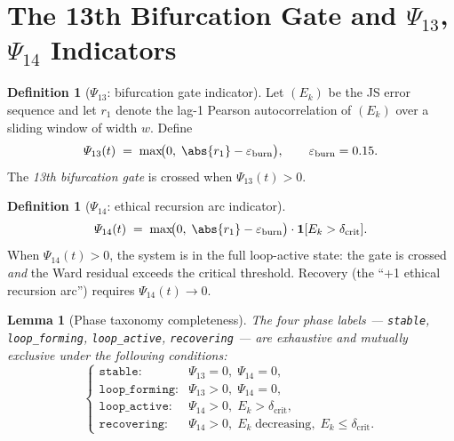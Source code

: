 \documentclass[12pt,a4paper]{article}
\theoremstyle{plain}
\newtheorem{lemma}[theorem]{Lemma}
\theoremstyle{definition}
\newtheorem{definition}[theorem]{Definition}
\renewcommand{\Psi}{\varPsi}
\begin{document}
\section{The 13th Bifurcation Gate and $\Psi_{13}$, $\Psi_{14}$ Indicators}
\label{sec:psi}

\begin{definition}[$\Psi_{13}$: bifurcation gate indicator]
  \label{def:psi13}
  Let $(E_k)$ be the JS error sequence and let $r_1$ denote the lag-1
  Pearson autocorrelation of $(E_k)$ over a sliding window of width $w$.
  Define
  \[
    \Psi_{13}(t) \;=\; \max\!\bigl(0,\; \abs{r_1} - \varepsilon_{\mathrm{burn}}\bigr),
    \qquad \varepsilon_{\mathrm{burn}} = 0.15.
  \]
  The \emph{13th bifurcation gate} is crossed when $\Psi_{13}(t) > 0$.
\end{definition}

\begin{definition}[$\Psi_{14}$: ethical recursion arc indicator]
  \label{def:psi14}
  \[
    \Psi_{14}(t) \;=\; \max\!\bigl(0,\;\abs{r_1} - \varepsilon_{\mathrm{burn}}\bigr)
                 \cdot \mathbf{1}[E_k > \delta_{\mathrm{crit}}].
  \]
  When $\Psi_{14}(t) > 0$, the system is in the full loop-active state:
  the gate is crossed \emph{and} the Ward residual exceeds the critical
  threshold.  Recovery (the ``+1 ethical recursion arc'') requires
  $\Psi_{14}(t) \to 0$.
\end{definition}

\begin{lemma}[Phase taxonomy completeness]
  \label{lem:phases}
  The four phase labels --- \texttt{stable}, \texttt{loop\_forming},
  \texttt{loop\_active}, \texttt{recovering} --- are exhaustive and
  mutually exclusive under the following conditions:
  \[
    \begin{cases}
      \texttt{stable}: & \Psi_{13}=0,\;\Psi_{14}=0,\\
      \texttt{loop\_forming}: & \Psi_{13}>0,\;\Psi_{14}=0,\\
      \texttt{loop\_active}: & \Psi_{14}>0,\;E_k>\delta_{\mathrm{crit}},\\
      \texttt{recovering}: & \Psi_{14}>0,\;E_k\;\text{decreasing},\;E_k\le\delta_{\mathrm{crit}}.
    \end{cases}
  \]
\end{lemma}
\end{document}
